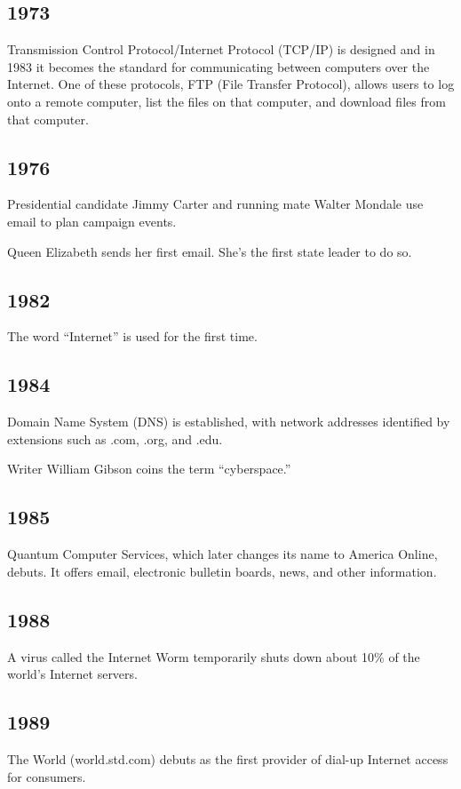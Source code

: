 \documentclass[letterpaper,12pt,english]{sphinxmanual}
\begin{document}
\subsection{1973}
\label{network-timeline:id3}
Transmission Control Protocol/Internet Protocol (TCP/IP) is designed and in 1983 it becomes the standard for communicating between computers over the Internet. One of these protocols, FTP (File Transfer Protocol), allows users to log onto a remote computer, list the files on that computer, and download files from that computer.


\subsection{1976}
\label{network-timeline:id4}
Presidential candidate Jimmy Carter and running mate Walter Mondale use email to plan campaign events.

Queen Elizabeth sends her first email. She's the first state leader to do so.


\subsection{1982}
\label{network-timeline:id5}
The word “Internet” is used for the first time.


\subsection{1984}
\label{network-timeline:id6}
Domain Name System (DNS) is established, with network addresses identified by extensions such as .com, .org, and .edu.

Writer William Gibson coins the term “cyberspace.”


\subsection{1985}
\label{network-timeline:id7}
Quantum Computer Services, which later changes its name to America Online, debuts. It offers email, electronic bulletin boards, news, and other information.


\subsection{1988}
\label{network-timeline:id8}
A virus called the Internet Worm temporarily shuts down about 10\% of the world's Internet servers.


\subsection{1989}
\label{network-timeline:id9}
The World (world.std.com) debuts as the first provider of dial-up Internet access for consumers.
\end{document}
